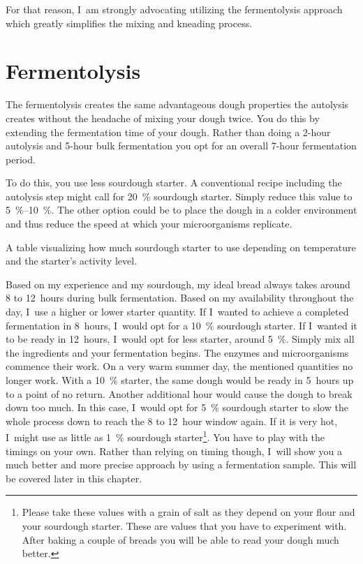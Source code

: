 For that reason, I~am strongly advocating utilizing the fermentolysis approach
which greatly simplifies the mixing and kneading process.

\section{Fermentolysis}%
\label{sec:fermentolysis}

The fermentolysis creates the same advantageous dough properties the
autolysis creates without the headache of mixing your dough twice. You do this
by extending the fermentation time of your dough. Rather than doing a 2-hour
autolysis and 5-hour bulk fermentation you opt for an overall 7-hour
fermentation period.

To do this, you use less sourdough starter. A conventional recipe including the
autolysis step might call for \qty{20}{\percent} sourdough starter. Simply reduce this
value to \qtyrange{5}{10}{\percent}. The other option could be to place the dough in a colder
environment and thus reduce the speed at which your microorganisms replicate.

\begin{table}[!htb]
    \centering
        
        \caption[Quantity of sourdough]{A table visualizing how much sourdough
            starter to use depending on temperature and the starter's activity
            level.}
\end{table}

Based on my experience and my sourdough, my ideal bread always takes around 8
to 12~hours during bulk fermentation. Based on my availability throughout the
day, I~use a higher or lower starter quantity. If I~wanted to achieve a
completed fermentation in 8~hours, I~would opt for a \qty{10}{\percent}
sourdough starter. If I~wanted it to be ready in 12~hours, I~would opt for
less starter, around \qty{5}{\percent}.  Simply mix all the ingredients and
your fermentation begins. The enzymes and microorganisms commence their work.
On a very warm summer day, the mentioned quantities no longer work. With a
\qty{10}{\percent} starter, the same dough would be ready in 5~hours up to a
point of no return. Another additional hour would cause the dough to break
down too much. In this case, I~would opt for \qty{5}{\percent} sourdough
starter to slow the whole process down to reach the 8 to 12~hour window again.
If it is very hot, I~might use as little as \qty{1}{\percent} sourdough
starter\footnote{Please take these values with a grain of salt as they depend
    on your flour and your sourdough starter. These are values that you have
    to experiment with. After baking a couple of breads you will be able to
    read your dough much better.}. You have to play with the timings on your
own.  Rather than relying on timing though, I~will show you a much better and
more precise approach by using a fermentation sample. This will be covered
later in this chapter.

